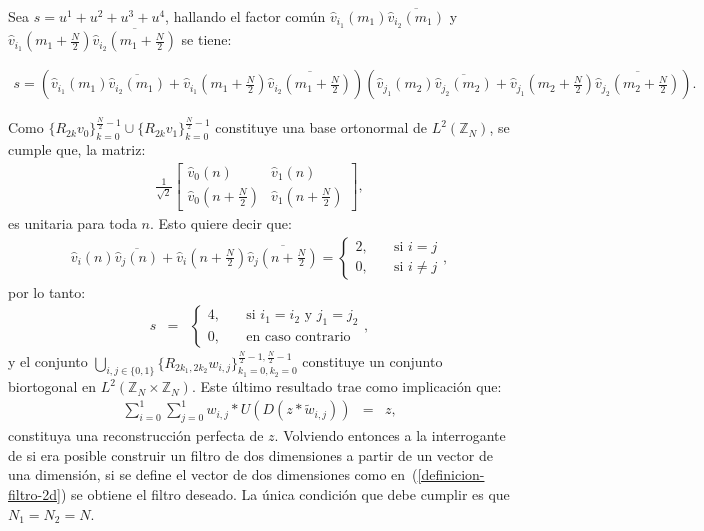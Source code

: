 \par Sea $s=u^1+u^2+u^3+u^4$, hallando el factor com\'un $\hat{v}_{i_1}(m_1)\overline{\hat{v}_{i_2}(m_1)}$ y\linebreak $\hat{v}_{i_1}\left(m_1+\frac{N}{2}\right)\overline{\hat{v}_{i_2}\left(m_1+\frac{N}{2}\right)}$ se tiene:
\begin{scriptsize}
\begin{eqnarray}
s=\left(\hat{v}_{i_1}(m_1)\overline{\hat{v}_{i_2}(m_1)}+\hat{v}_{i_1}\left(m_1+\frac{N}{2}\right)\overline{\hat{v}_{i_2}\left(m_1+\frac{N}{2}\right)}\right)\left(\hat{v}_{j_1}(m_2)\overline{\hat{v}_{j_2}(m_2)}+\hat{v}_{j_1}\left(m_2+\frac{N}{2}\right)\overline{\hat{v}_{j_2}\left(m_2+\frac{N}{2}\right)}\right).\nonumber
\end{eqnarray}
\end{scriptsize}
\par Como $\{R_{2k}v_0\}_{k=0}^{\frac{N}{2}-1}\cup\{R_{2k}v_1\}_{k=0}^{\frac{N}{2}-1}$ constituye una base ortonormal de $L^2(\mathbb{Z}_N)$, se cumple que, la matriz:
\begin{eqnarray}
\frac{1}{\sqrt{2}}\left[\begin{array}{cc}
\hat{v}_0(n)&\hat{v}_1(n)\\
\hat{v}_0\left(n+\frac{N}{2}\right)&\hat{v}_1\left(n+\frac{N}{2}\right)
\end{array}\right],\nonumber
\end{eqnarray}
es unitaria para toda $n$. Esto quiere decir que:
\begin{eqnarray}
\hat{v}_i(n)\overline{\hat{v}_j(n)}+\hat{v}_i\left(n+\frac{N}{2}\right)\overline{\hat{v}_j\left(n+\frac{N}{2}\right)}=\left\{\begin{array}{ll}
2,&\quad\mbox{si $i=j$}\\
0,&\quad\mbox{si $i\neq j$}
\end{array}\right.,\nonumber
\end{eqnarray}
por lo tanto:
\begin{eqnarray}
s&=&\left\{\begin{array}{ll}
4,&\quad\mbox{si $i_1=i_2$ y $j_1=j_2$}\\
0,&\quad\mbox{en caso contrario}
\end{array}\right.,\nonumber
\end{eqnarray}
y el conjunto $\displaystyle\bigcup_{i,j\in\{0,1\}}\{R_{2k_1,2k_2}w_{i,j}\}_{k_1=0,k_2=0}^{\frac{N}{2}-1,\frac{N}{2}-1}$ constituye un conjunto biortogonal en $L^2(\mathbb{Z}_N\times\mathbb{Z}_N)$. Este \'ultimo resultado trae como implicaci\'on que:
\begin{eqnarray}
\sum_{i=0}^1\sum_{j=0}^1w_{i,j}\ast U(D(z\ast\tilde{w}_{i,j}))&=&z,\nonumber
\end{eqnarray}
constituya una reconstrucci\'on perfecta de $z$. Volviendo entonces a la interrogante de si era posible construir un filtro de dos dimensiones a partir de un vector de una dimensi\'on, si se define el vector de dos dimensiones como en~(\ref{definicion-filtro-2d}) se obtiene el filtro deseado. La \'unica condici\'on que debe cumplir es que $N_1=N_2=N$.


